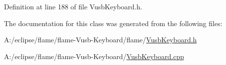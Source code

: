 Definition at line 188 of file Vusb\-Keyboard.\-h.



The documentation for this class was generated from the following files\-:\begin{DoxyCompactItemize}
\item 
A\-:/eclipse/flame/flame-\/\-Vusb-\/\-Keyboard/flame/\hyperlink{_vusb_keyboard_8h}{Vusb\-Keyboard.\-h}\item 
A\-:/eclipse/flame/flame-\/\-Vusb-\/\-Keyboard/\hyperlink{_vusb_keyboard_8cpp}{Vusb\-Keyboard.\-cpp}\end{DoxyCompactItemize}
